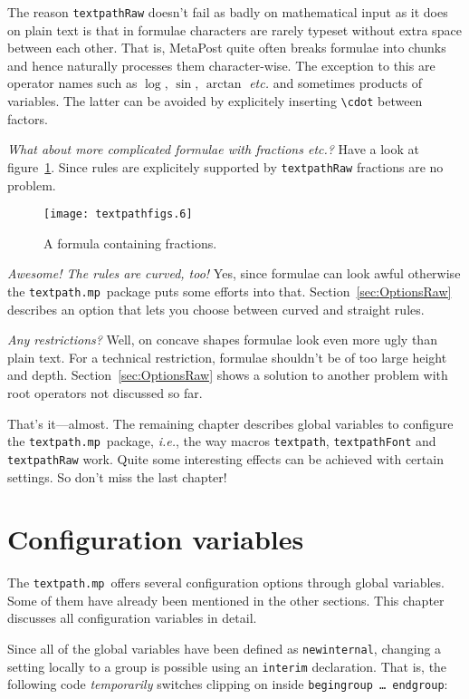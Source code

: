 \documentclass{article}
\newcommand*{\cmd}[1]{\texttt{#1}}
\newcommand*{\pkg}{\cmd{textpath.mp}}
\newcommand{\user}[1]{\emph{#1}}
\begin{document}
The reason \cmd{textpathRaw} doesn't fail as badly on mathematical input as it does on plain text is that in formulae characters are rarely typeset without extra space between each other.  That is, MetaPost quite often breaks formulae into chunks and hence naturally processes them character-wise.  The exception to this are operator names such as $\log$, $\sin$, $\arctan$ \emph{etc.\@} and sometimes products of variables.  The latter can be avoided by explicitely inserting \verb+\cdot+ between factors.

\user{What about more complicated formulae with fractions \emph{etc.}?}  Have a look at figure~\ref{fig:rawFraction}.  Since rules are explicitely supported by \cmd{textpathRaw} fractions are no problem.

\begin{figure}
  \centering
  \texttt{[image: textpathfigs.6]}
  \caption{A formula containing fractions.}
  \label{fig:rawFraction}
\end{figure}

\user{Awesome!  The rules are curved, too!}  Yes, since formulae can look awful otherwise the \pkg\ package puts some efforts into that.  Section~\ref{sec:OptionsRaw} describes an option that lets you choose between curved and straight rules.

\user{Any restrictions?}  Well, on concave shapes formulae look even more ugly than plain text.  For a technical restriction, formulae shouldn't be of too large height and depth.  Section~\ref{sec:OptionsRaw} shows a solution to another problem with root operators not discussed so far.

That's it---almost.  The remaining chapter describes global variables to configure the \pkg\ package, \emph{i.e.}, the way macros \cmd{textpath}, \cmd{textpathFont} and \cmd{textpathRaw} work.  Quite some interesting effects can be achieved with certain settings.  So don't miss the last chapter!



\section{Configuration variables}\label{sec:Configuration}
The \pkg\ offers several configuration options through global variables.  Some of them have already been mentioned in the other sections.  This chapter discusses all configuration variables in detail.

Since all of the global variables have been defined as \cmd{newinternal}, changing a setting locally to a group is possible using an \cmd{interim} declaration.  That is, the following code \emph{temporarily} switches clipping on inside \cmd{begingroup \ldots\ endgroup}:
\end{document}

